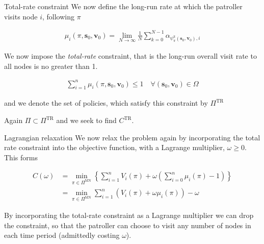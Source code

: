 \documentclass[10pt]{beamer}
\begin{document}
\begin{frame}{Total-rate constraint}
We now define the long-run rate at which the patroller visits node $i$, following $\pi$

\begin{align*}
\mu_{i}(\pi,\bm{s}_{0},\bm{v}_{0})=\lim\limits_{N \rightarrow \infty} \frac{1}{N} \sum\limits_{k=0}^{N-1} \alpha_{\psi_{\pi}^{k}(\bm{s}_{0},\bm{v}_{0}),i}
\end{align*}

We now impose the \textit{total-rate} constraint, that is the long-run overall visit rate to all nodes is no greater than 1. 

\begin{align*}
\sum\limits_{i=1}^{n} \mu_{i}(\pi,\bm{s}_{0},\bm{v}_{0}) \leq 1 \quad \forall (\bm{s}_{0},\bm{v}_{0}) \in \Omega
\end{align*}

and we denote the set of policies, which satisfy this constraint by $\Pi^{\text{TR}}$

Again $\Pi \subset \Pi^{\text{TR}}$ and we seek to find $C^{\text{TR}}$.
\end{frame}

\begin{frame}{Lagrangian relaxation}
We now relax the problem again by incorporating the total rate constraint into the objective function, with a Lagrange multiplier, $\omega \geq 0$. This forms

\begin{align*}
C(\omega)&=\min_{\pi \in \Pi^{\text{MN}}} \left\{ \sum\limits_{i=1}^{n} V_{i}(\pi) + \omega \left( \sum\limits_{i=0}^{n} \mu_{i}(\pi) -1 \right) \right\} \\
&=\min_{\pi \in \Pi^{\text{MN}}} \sum\limits_{i=1}^{n} (V_{i}(\pi)+\omega \mu_{i}(\pi)) - \omega
\end{align*}

By incorporating the total-rate constraint as a Lagrange multiplier we can drop the constraint, so that the patroller can choose to visit any number of nodes in each time period (admittedly costing $\omega$).
\end{frame}
\end{document}
